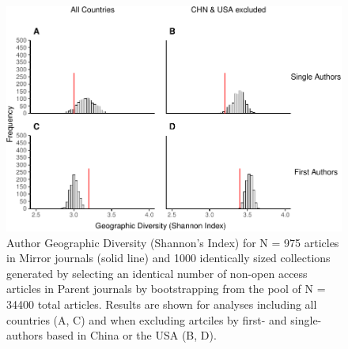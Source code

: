 \documentclass[
]{article}
\begin{document}
\begin{figure}

{\centering \includegraphics{Smith_etal_QSS_Supplement_files/figure-latex/FigS4-1} 

}

\caption{Author Geographic Diversity (Shannon's Index) for N =  975  articles in Mirror journals (solid line) and 1000 identically sized collections generated by selecting an identical number of non-open access articles in Parent journals by bootstrapping from the pool of N =  34400  total articles. Results are shown for analyses including all countries (A, C) and when excluding artciles by first- and single-authors based in China or the USA (B, D).}\label{fig:FigS4}
\end{figure}
\end{document}
